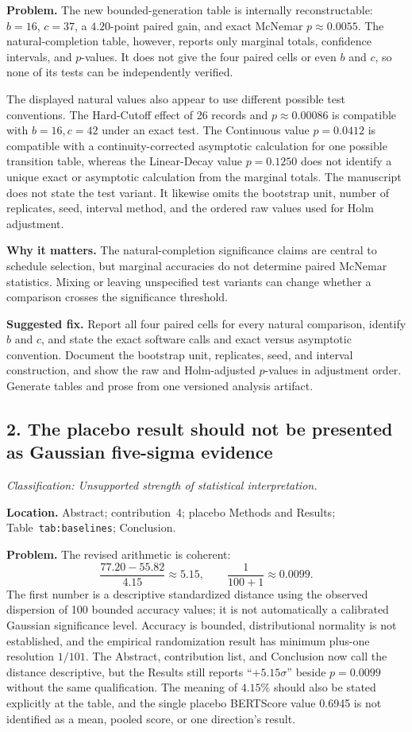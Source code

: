 \documentclass[11pt]{article}
\newcommand{\findinglabel}[1]{\textbf{#1}}
\newcommand{\classification}[1]{\textit{Classification: #1.}}
\begin{document}
\findinglabel{Problem.} The new bounded-generation table is internally reconstructable: $b=16$, $c=37$, a $4.20$-point paired gain, and exact McNemar $p\approx0.0055$.  The natural-completion table, however, reports only marginal totals, confidence intervals, and $p$-values.  It does not give the four paired cells or even $b$ and $c$, so none of its tests can be independently verified.

The displayed natural values also appear to use different possible test conventions.  The Hard-Cutoff effect of 26 records and $p\approx0.00086$ is compatible with $b=16,c=42$ under an exact test.  The Continuous value $p=0.0412$ is compatible with a continuity-corrected asymptotic calculation for one possible transition table, whereas the Linear-Decay value $p=0.1250$ does not identify a unique exact or asymptotic calculation from the marginal totals.  The manuscript does not state the test variant.  It likewise omits the bootstrap unit, number of replicates, seed, interval method, and the ordered raw values used for Holm adjustment.

\findinglabel{Why it matters.} The natural-completion significance claims are central to schedule selection, but marginal accuracies do not determine paired McNemar statistics.  Mixing or leaving unspecified test variants can change whether a comparison crosses the significance threshold.

\findinglabel{Suggested fix.} Report all four paired cells for every natural comparison, identify $b$ and $c$, and state the exact software calls and exact versus asymptotic convention.  Document the bootstrap unit, replicates, seed, and interval construction, and show the raw and Holm-adjusted $p$-values in adjustment order.  Generate tables and prose from one versioned analysis artifact.

\subsection*{2. The placebo result should not be presented as Gaussian five-sigma evidence}

\classification{Unsupported strength of statistical interpretation}

\findinglabel{Location.} Abstract; contribution~4; placebo Methods and Results; Table~\texttt{tab:baselines}; Conclusion.

\findinglabel{Problem.} The revised arithmetic is coherent:
\[
\frac{77.20-55.82}{4.15}\approx5.15,
\qquad
\frac{1}{100+1}\approx0.0099.
\]
The first number is a descriptive standardized distance using the observed dispersion of 100 bounded accuracy values; it is not automatically a calibrated Gaussian significance level.  Accuracy is bounded, distributional normality is not established, and the empirical randomization result has minimum plus-one resolution $1/101$.  The Abstract, contribution list, and Conclusion now call the distance descriptive, but the Results still reports ``$+5.15\sigma$'' beside $p=0.0099$ without the same qualification.  The meaning of $4.15\%$ should also be stated explicitly at the table, and the single placebo BERTScore value 0.6945 is not identified as a mean, pooled score, or one direction's result.
\end{document}
